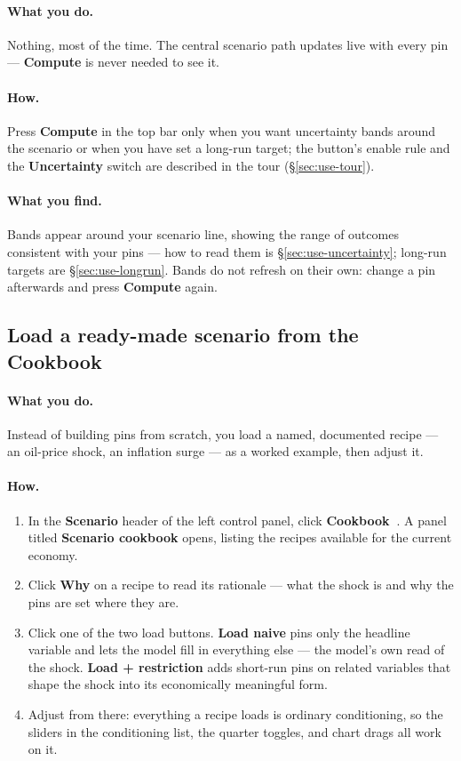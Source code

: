 \documentclass[11pt]{article}
\theoremstyle{definition}
\theoremstyle{remark}
\begin{document}
\paragraph{What you do.} Nothing, most of the time. The central scenario path
updates live with every pin --- \textbf{Compute} is never needed to see it.

\paragraph{How.} Press \textbf{Compute} in the top bar only when you want
uncertainty bands around the scenario or when you have set a long-run target; the
button's enable rule and the \textbf{Uncertainty} switch are described in the tour
(\S\ref{sec:use-tour}).

\paragraph{What you find.} Bands appear around your scenario line, showing the range
of outcomes consistent with your pins --- how to read them is
\S\ref{sec:use-uncertainty}; long-run targets are \S\ref{sec:use-longrun}. Bands do
not refresh on their own: change a pin afterwards and press \textbf{Compute} again.

\subsection{Load a ready-made scenario from the Cookbook}

\paragraph{What you do.} Instead of building pins from scratch, you load a named,
documented recipe --- an oil-price shock, an inflation surge --- as a worked
example, then adjust it.

\paragraph{How.}
\begin{enumerate}
  \item In the \textbf{Scenario} header of the left control panel, click
    \textbf{Cookbook~\raisebox{-0.2ex}{$\blacktriangledown$}}. A panel titled
    \textbf{Scenario cookbook} opens, listing the recipes available for the current
    economy.
  \item Click \textbf{Why} on a recipe to read its rationale --- what the shock is
    and why the pins are set where they are.
  \item Click one of the two load buttons. \textbf{Load naive} pins only the
    headline variable and lets the model fill in everything else --- the model's own
    read of the shock. \textbf{Load + restriction} adds short-run pins on related
    variables that shape the shock into its economically meaningful form.
  \item Adjust from there: everything a recipe loads is ordinary conditioning, so
    the sliders in the conditioning list, the quarter toggles, and chart drags all
    work on it.
\end{enumerate}
\end{document}
